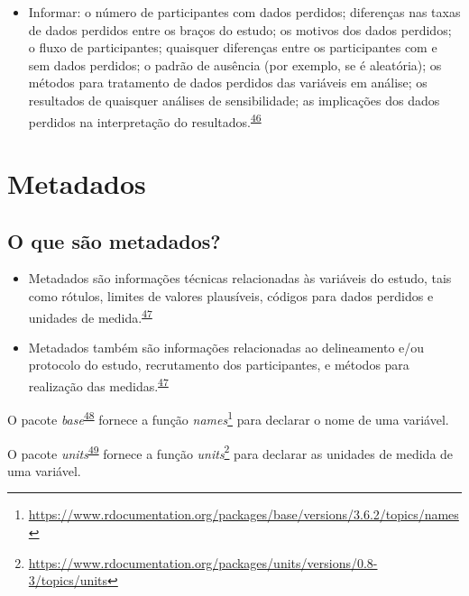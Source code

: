 \documentclass[
  a4paper,
]{book}
\providecommand{\tightlist}{%
  \setlength{\itemsep}{0pt}\setlength{\parskip}{0pt}}
\renewcommand{\href}[2]{#2\footnote{\url{#1}}}
\newenvironment{infobox}[1]
  {
  \begin{itemize}
  \renewcommand{\labelitemi}{
    \raisebox{-.7\height}[0pt][0pt]{
      {\setkeys{Gin}{width=3em,keepaspectratio}
        \texttt{[image: \#1]}}
    }
  }
  \setlength{\fboxsep}{1em}
  \begin{blackbox}
  \item
  }
  {
  \end{blackbox}
  \end{itemize}
  }
\begin{document}
\begin{itemize}
\tightlist
\item
  Informar: o número de participantes com dados perdidos; diferenças nas taxas de dados perdidos entre os braços do estudo; os motivos dos dados perdidos; o fluxo de participantes; quaisquer diferenças entre os participantes com e sem dados perdidos; o padrão de ausência (por exemplo, se é aleatória); os métodos para tratamento de dados perdidos das variáveis em análise; os resultados de quaisquer análises de sensibilidade; as implicações dos dados perdidos na interpretação do resultados.\textsuperscript{\protect\hyperlink{ref-Akl2015}{46}}
\end{itemize}

\hypertarget{metadados}{%
\section{Metadados}\label{metadados}}

\hypertarget{o-que-suxe3o-metadados}{%
\subsection{O que são metadados?}\label{o-que-suxe3o-metadados}}

\begin{itemize}
\item
  Metadados são informações técnicas relacionadas às variáveis do estudo, tais como rótulos, limites de valores plausíveis, códigos para dados perdidos e unidades de medida.\textsuperscript{\protect\hyperlink{ref-Baillie2022}{47}}
\item
  Metadados também são informações relacionadas ao delineamento e/ou protocolo do estudo, recrutamento dos participantes, e métodos para realização das medidas.\textsuperscript{\protect\hyperlink{ref-Baillie2022}{47}}
\end{itemize}

\begin{infobox}{images/Rlogo}
O pacote \emph{base}\textsuperscript{\protect\hyperlink{ref-base-3}{48}} fornece a função \href{https://www.rdocumentation.org/packages/base/versions/3.6.2/topics/names}{\emph{names}} para declarar o nome de uma variável.

\end{infobox}

\begin{infobox}{images/Rlogo}
O pacote \emph{units}\textsuperscript{\protect\hyperlink{ref-units}{49}} fornece a função \href{https://www.rdocumentation.org/packages/units/versions/0.8-3/topics/units}{\emph{units}} para declarar as unidades de medida de uma variável.

\end{infobox}
\end{document}

